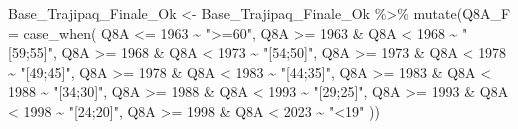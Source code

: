 \documentclass[
]{article}
\newenvironment{Shaded}{\begin{snugshade}}{\end{snugshade}}
\newcommand{\AttributeTok}[1]{\textcolor[rgb]{0.77,0.63,0.00}{#1}}
\newcommand{\DecValTok}[1]{\textcolor[rgb]{0.00,0.00,0.81}{#1}}
\newcommand{\FunctionTok}[1]{\textcolor[rgb]{0.00,0.00,0.00}{#1}}
\newcommand{\NormalTok}[1]{#1}
\newcommand{\OtherTok}[1]{\textcolor[rgb]{0.56,0.35,0.01}{#1}}
\newcommand{\SpecialCharTok}[1]{\textcolor[rgb]{0.00,0.00,0.00}{#1}}
\newcommand{\StringTok}[1]{\textcolor[rgb]{0.31,0.60,0.02}{#1}}
\begin{document}
\begin{Shaded}
\begin{Highlighting}[]
\NormalTok{Base\_Trajipaq\_Finale\_Ok }\OtherTok{\textless{}{-}}
\NormalTok{  Base\_Trajipaq\_Finale\_Ok }\SpecialCharTok{\%\textgreater{}\%}
  \FunctionTok{mutate}\NormalTok{(}\AttributeTok{Q8A\_F =} \FunctionTok{case\_when}\NormalTok{(}
\NormalTok{    Q8A }\SpecialCharTok{\textless{}=} \DecValTok{1963} \SpecialCharTok{\textasciitilde{}} \StringTok{"\textgreater{}=60"}\NormalTok{,}
\NormalTok{    Q8A }\SpecialCharTok{\textgreater{}=} \DecValTok{1963} \SpecialCharTok{\&}\NormalTok{ Q8A }\SpecialCharTok{\textless{}} \DecValTok{1968} \SpecialCharTok{\textasciitilde{}} \StringTok{"[59;55]"}\NormalTok{,}
\NormalTok{    Q8A }\SpecialCharTok{\textgreater{}=} \DecValTok{1968} \SpecialCharTok{\&}\NormalTok{ Q8A }\SpecialCharTok{\textless{}} \DecValTok{1973} \SpecialCharTok{\textasciitilde{}} \StringTok{"[54;50]"}\NormalTok{,}
\NormalTok{    Q8A }\SpecialCharTok{\textgreater{}=} \DecValTok{1973} \SpecialCharTok{\&}\NormalTok{ Q8A }\SpecialCharTok{\textless{}} \DecValTok{1978} \SpecialCharTok{\textasciitilde{}} \StringTok{"[49;45]"}\NormalTok{,}
\NormalTok{    Q8A }\SpecialCharTok{\textgreater{}=} \DecValTok{1978} \SpecialCharTok{\&}\NormalTok{ Q8A }\SpecialCharTok{\textless{}} \DecValTok{1983} \SpecialCharTok{\textasciitilde{}} \StringTok{"[44;35]"}\NormalTok{,}
\NormalTok{    Q8A }\SpecialCharTok{\textgreater{}=} \DecValTok{1983} \SpecialCharTok{\&}\NormalTok{ Q8A }\SpecialCharTok{\textless{}} \DecValTok{1988} \SpecialCharTok{\textasciitilde{}} \StringTok{"[34;30]"}\NormalTok{,}
\NormalTok{    Q8A }\SpecialCharTok{\textgreater{}=} \DecValTok{1988} \SpecialCharTok{\&}\NormalTok{ Q8A }\SpecialCharTok{\textless{}} \DecValTok{1993} \SpecialCharTok{\textasciitilde{}} \StringTok{"[29;25]"}\NormalTok{,}
\NormalTok{    Q8A }\SpecialCharTok{\textgreater{}=} \DecValTok{1993} \SpecialCharTok{\&}\NormalTok{ Q8A }\SpecialCharTok{\textless{}} \DecValTok{1998} \SpecialCharTok{\textasciitilde{}} \StringTok{"[24;20]"}\NormalTok{,}
\NormalTok{    Q8A }\SpecialCharTok{\textgreater{}=} \DecValTok{1998} \SpecialCharTok{\&}\NormalTok{ Q8A }\SpecialCharTok{\textless{}} \DecValTok{2023} \SpecialCharTok{\textasciitilde{}} \StringTok{"\textless{}19"}
\NormalTok{  ))}
\end{Highlighting}
\end{Shaded}
\end{document}
